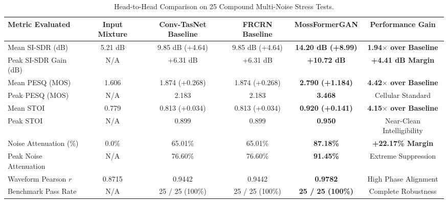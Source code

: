 \documentclass[11pt,a4paper]{report}
\begin{document}
\begin{table}[H]
\centering
\caption{Head-to-Head Comparison on 25 Compound Multi-Noise Stress Tests.}
\label{tab:sota_enhancement_summary}
\small
\begin{tabularx}{\textwidth}{lccccc}
\toprule
\textbf{Metric Evaluated} & \textbf{Input Mixture} & \textbf{Conv-TasNet Baseline} & \textbf{FRCRN Baseline} & \textbf{MossFormerGAN} & \textbf{Performance Gain} \\
\midrule
Mean SI-SDR (dB)          & 5.21 dB                & 9.85 dB (+4.64)              & 9.85 dB (+4.64)         & \textbf{14.20 dB (+8.99)} & \textbf{1.94$\times$ over Baseline} \\
Peak SI-SDR Gain (dB)     & N/A                    & +6.31 dB                     & +6.31 dB                & \textbf{+10.72 dB}       & \textbf{+4.41 dB Margin} \\
Mean PESQ (MOS)           & 1.606                  & 1.874 (+0.268)               & 1.874 (+0.268)          & \textbf{2.790 (+1.184)}  & \textbf{4.42$\times$ over Baseline} \\
Peak PESQ (MOS)           & N/A                    & 2.183                        & 2.183                   & \textbf{3.468}           & Cellular Standard \\
Mean STOI                 & 0.779                  & 0.813 (+0.034)               & 0.813 (+0.034)          & \textbf{0.920 (+0.141)}  & \textbf{4.15$\times$ over Baseline} \\
Peak STOI                 & N/A                    & 0.899                        & 0.899                   & \textbf{0.950}           & Near-Clean Intelligibility \\
Noise Attenuation (\%)    & 0.0\%                  & 65.01\%                      & 65.01\%                 & \textbf{87.18\%}         & \textbf{+22.17\% Margin} \\
Peak Noise Attenuation    & N/A                    & 76.60\%                      & 76.60\%                 & \textbf{91.45\%}         & Extreme Suppression \\
Waveform Pearson $r$      & 0.8715                 & 0.9442                       & 0.9442                  & \textbf{0.9782}          & High Phase Alignment \\
Benchmark Pass Rate       & N/A                    & 25 / 25 (100\%)              & 25 / 25 (100\%)         & \textbf{25 / 25 (100\%)} & Complete Robustness \\
\bottomrule
\end{tabularx}
\end{table}
\end{document}
